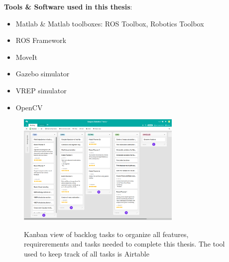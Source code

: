 \textbf{Tools \& Software used in this thesis}:
\begin{itemize}
\item Matlab \& Matlab toolboxes: ROS Toolbox, Robotics Toolbox
\item ROS Framework
\item MoveIt
\item Gazebo simulator
\item VREP simulator
\item OpenCV
\end{itemize}

\begin{center}
\begin{figure}[H]
\centering
\includegraphics[width=0.7\textwidth]{images/task-backlog-airtable.png}\\
\caption{Kanban view of backlog tasks to organize all features, requirerements and tasks needed to complete this thesis. The tool used to keep track of all tasks is Airtable}
\end{figure}
\end{center}